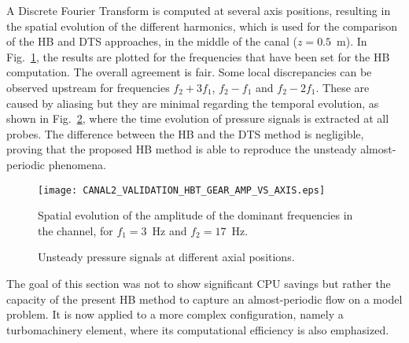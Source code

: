 A Discrete Fourier Transform is computed at several axis positions,
resulting in the spatial evolution of the different harmonics, which
is used for the comparison of the HB and DTS approaches, in the middle
of the canal ($z = 0.5$~m).  In
Fig.~\ref{fig:canal2_validation_hbt_gear_amp_vs_axis}, the results are
plotted for the frequencies that have been set for the HB computation.
The overall agreement is fair.  Some local discrepancies can be
observed upstream for frequencies $f_2 + 3f_1$, $f_2 - f_1$ and $f_2 -
2f_1$. These are caused by aliasing
 but they are minimal regarding the temporal evolution, as
shown in Fig.~\ref{fig:canal2_validation_hbt_gear_time_ev}, where the
time evolution of pressure signals is extracted at all probes.  The
difference between the HB and the DTS method is negligible, proving
that the proposed HB method is able to reproduce the unsteady
almost-periodic phenomena.
\begin{figure}[htbp]
  \centering
  \texttt{[image: CANAL2\_VALIDATION\_HBT\_GEAR\_AMP\_VS\_AXIS.eps]}
  \caption{Spatial evolution of the amplitude of the dominant
    frequencies in the channel, for $f_1 = 3$~Hz and $f_2 = 17$~Hz.}
  \label{fig:canal2_validation_hbt_gear_amp_vs_axis}
\end{figure}

\begin{figure}[htb]
  \centering 
   \quad{}
  \caption{Unsteady pressure signals at different axial positions.}
  \label{fig:canal2_validation_hbt_gear_time_ev}
\end{figure}

The goal of this section was not to show significant CPU savings but
rather the capacity of the present HB method to capture an
almost-periodic flow on a model problem.  It is now applied to a more
complex configuration, namely a turbomachinery element, where its
computational efficiency is also emphasized.

